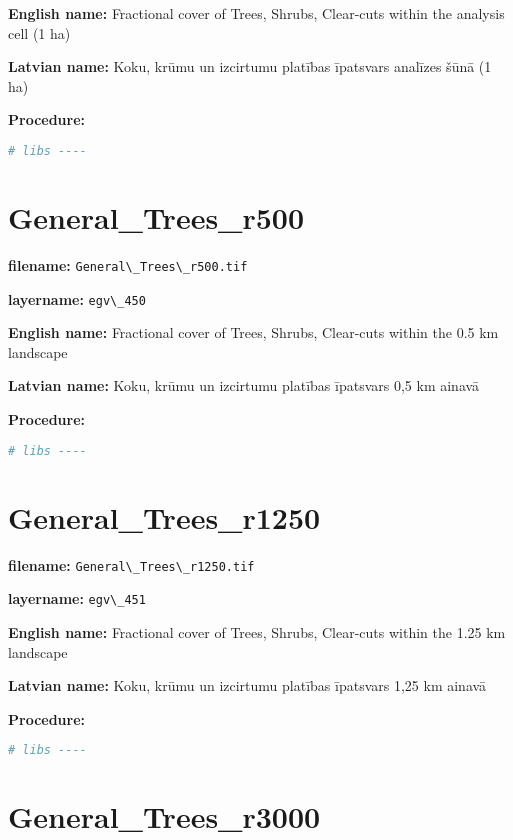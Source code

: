\documentclass[
]{book}
\newcommand{\passthrough}[1]{#1}
\begin{document}
\textbf{English name:} Fractional cover of Trees, Shrubs, Clear-cuts within the analysis cell (1 ha)

\textbf{Latvian name:} Koku, krūmu un izcirtumu platības īpatsvars analīzes šūnā (1 ha)

\textbf{Procedure:}

\begin{lstlisting}[language=R]
# libs ----
\end{lstlisting}

\section{General\_Trees\_r500}\label{ch06.450}

\textbf{filename:} \passthrough{\lstinline!General\_Trees\_r500.tif!}

\textbf{layername:} \passthrough{\lstinline!egv\_450!}

\textbf{English name:} Fractional cover of Trees, Shrubs, Clear-cuts within the 0.5 km landscape

\textbf{Latvian name:} Koku, krūmu un izcirtumu platības īpatsvars 0,5 km ainavā

\textbf{Procedure:}

\begin{lstlisting}[language=R]
# libs ----
\end{lstlisting}

\section{General\_Trees\_r1250}\label{ch06.451}

\textbf{filename:} \passthrough{\lstinline!General\_Trees\_r1250.tif!}

\textbf{layername:} \passthrough{\lstinline!egv\_451!}

\textbf{English name:} Fractional cover of Trees, Shrubs, Clear-cuts within the 1.25 km landscape

\textbf{Latvian name:} Koku, krūmu un izcirtumu platības īpatsvars 1,25 km ainavā

\textbf{Procedure:}

\begin{lstlisting}[language=R]
# libs ----
\end{lstlisting}

\section{General\_Trees\_r3000}\label{ch06.452}
\end{document}
